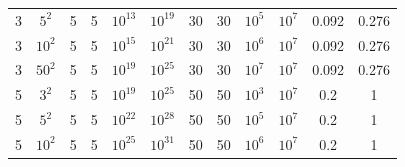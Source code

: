 \begin{table}[!t]
\begin{tabular}{cccccccccccc}
\rowcolor[rgb]{0.925,0.957,1} 3  & $5^2$   & 5         & 5       & $10^{13}$   & $10^{19}$                                                                & 30     & 30                                                                                    & $10^{5}$     & $10^{7}$     & 0.092  & 0.276                                                                                                \\
3                                & $10^2$  & 5         & 5       & $10^{15}$   & $10^{21}$                                                                & 30     & 30                                                                                    & $10^{6}$     & $10^{7}$     & 0.092  & 0.276                                                                                                \\
\rowcolor[rgb]{0.925,0.957,1} 3  & $50^2$  & 5         & 5       & $10^{19}$   & $10^{25}$                                                                & 30     & 30                                                                                    & $10^{7}$     & $10^{7}$     & 0.092  & 0.276                                                                                                \\
5                                & $3^2$   & 5         & 5       & $10^{19}$   & $10^{25}$                                                                & 50     & 50                                                                                    & $10^{3}$     & $10^{7}$     & 0.2    & 1                                                                                                    \\
\rowcolor[rgb]{0.925,0.957,1} 5  & $5^2$   & 5         & 5       & $10^{22}$   & $10^{28}$                                                                & 50     & 50                                                                                    & $10^{5}$     & $10^{7}$     & 0.2    & 1                                                                                                    \\
5                                & $10^2$  & 5         & 5       & $10^{25}$   & $10^{31}$                                                                & 50     & 50                                                                                    & $10^{6}$     & $10^{7}$     & 0.2    & 1                                                                                                    \\

\end{tabular}
\end{table}
